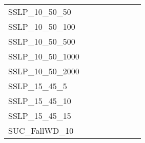 \begin{table}[H]
{\begin{tabular}{|l|ll|ll|l|l|l|}
			SSLP\_10\_50\_50               &                                 &                                &                                  &                                 &                                    &                            &                            \\
			SSLP\_10\_50\_100              &                                 &                                &                                  &                                 &                                    &                            &                            \\
			SSLP\_10\_50\_500              &                                 &                                &                                  &                                 &                                    &                            &                            \\			
			SSLP\_10\_50\_1000              &                                 &                                &                                  &                                 &                                    &                            &                            \\			
			SSLP\_10\_50\_2000              &                                 &                                &                                  &                                 &                                    &                            &                            \\			
			SSLP\_15\_45\_5               &                                 &                                &                                  &                                 &                                    &                            &                            \\
			SSLP\_15\_45\_10               &                                 &                                &                                  &                                 &                                    &                            &                            \\			
			SSLP\_15\_45\_15              &                                 &                                &                                  &                                 &                                    &                            &                            \\ \hline
			SUC\_FallWD\_10                &                                 &                                &                                  &                                 &                                    &                            &                            \\

\end{tabular}}
\end{table}
